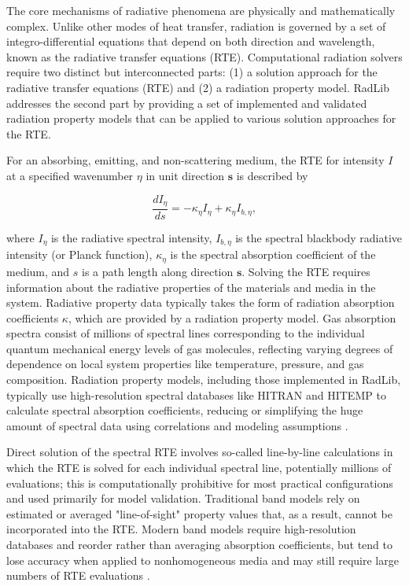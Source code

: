 \documentclass[preprint,12pt]{elsarticle}
\newcounter{bla}
\begin{document}
The core mechanisms of radiative phenomena are physically and mathematically complex. Unlike other modes of heat transfer, radiation is governed by a set of integro-differential equations that depend on both direction and wavelength, known as the radiative transfer equations (RTE). Computational radiation solvers require two distinct but interconnected parts: (1) a solution approach for the radiative transfer equations (RTE) and (2) a radiation property model. RadLib addresses the second part by providing a set of implemented and validated radiation property models that can be applied to various solution approaches for the RTE. 

For an absorbing, emitting, and non-scattering medium, the RTE for intensity $I$ at a specified wavenumber $\eta$ in unit direction $\mathbf{s}$ is described by
% 
\begin{linenomath}
\begin{equation} \label{e:RTE_general}
    \frac{dI_{\eta}}{ds} = -\kappa_{\eta}I_{\eta} + \kappa_{\eta}I_{b,\eta},
\end{equation}
\end{linenomath}
%
where $I_{\eta}$ is the radiative spectral intensity, $I_{b,\eta}$ is the spectral blackbody radiative intensity (or Planck function), $\kappa_{\eta}$ is the spectral absorption coefficient of the medium, and $s$ is a path length along direction $\mathbf{s}$. Solving the RTE requires information about the radiative properties of the materials and media in the system. Radiative property data typically takes the form of radiation absorption coefficients $\kappa$, which are provided by a radiation property model. Gas absorption spectra consist of millions of spectral lines corresponding to the individual quantum mechanical energy levels of gas molecules, reflecting varying degrees of dependence on local system properties like temperature, pressure, and gas composition. Radiation property models, including those implemented in RadLib, typically use high-resolution spectral databases like HITRAN and HITEMP \cite{Rothman_2010} to calculate spectral absorption coefficients, reducing or simplifying the huge amount of spectral data using correlations and modeling assumptions \cite{Zhang_2002b}. 

Direct solution of the spectral RTE involves so-called line-by-line calculations in which the RTE is solved for each individual spectral line, potentially millions of evaluations; this is computationally prohibitive for most practical configurations and used primarily for model validation. Traditional band models rely on estimated or averaged "line-of-sight" property values that, as a result, cannot be incorporated into the RTE. Modern band models require high-resolution databases and reorder rather than averaging absorption coefficients, but tend to lose accuracy when applied to nonhomogeneous media and may still require large numbers of RTE evaluations \citep{Modest_2016}. 
\end{document}

